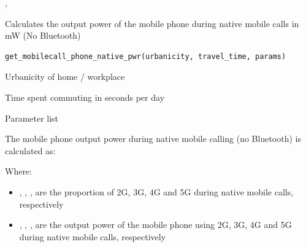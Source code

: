 \documentclass[a4paper]{book}
\begin{document}
%
\begin{SeeAlso}
, 
\end{SeeAlso}
%
\begin{Description}
Calculates the output power of the mobile phone during native mobile calls in mW (No Bluetooth)
\end{Description}
%
\begin{Usage}
\begin{verbatim}
get_mobilecall_phone_native_pwr(urbanicity, travel_time, params)
\end{verbatim}
\end{Usage}
%
\begin{Arguments}
\begin{ldescription}
\item[\code{urbanicity}] Urbanicity of home / workplace

\item[\code{travel\_time}] Time spent commuting in seconds per day

\item[\code{params}] Parameter list
\end{ldescription}
\end{Arguments}
%
\begin{Details}
The mobile phone output power during native mobile calling (no Bluetooth) is calculated as:

Where:
\begin{itemize}

\item{} , , ,  are the proportion of 2G, 3G, 4G and 5G during native mobile calls, respectively
\item{} , , ,  are the output power of the mobile phone using 2G, 3G, 4G and 5G during native mobile calls, respectively

\end{itemize}

\end{Details}
\end{document}
